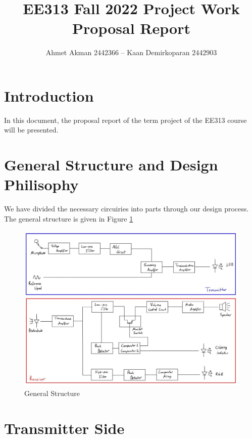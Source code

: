 \documentclass[a4paper,10pt]{IEEEtran}
\title{ \vspace{-2ex} EE313 Fall 2022 Project Work  \protect\\ Proposal Report}
\author{ Ahmet Akman 2442366 -- Kaan Demirkoparan 2442903 \vspace{-2ex}}
\date{}
\begin{document}
\thispagestyle{empty}
\vspace{-2cm}


\maketitle
\vspace{-5cm}

\section{Introduction}
In this document, the proposal report of the term project of the EE313 course will be presented. 
\vspace{-0.4cm}
\section{General Structure and Design Philisophy}
We have divided the necessary circuiries into parts through our design process. The general structure is given in Figure \ref*{general}
\begin{figure}[htbp!]
    \centering
    \includegraphics[width = 1\linewidth]{general_structure.jpeg}
    \caption{General Structure}
    \label{general}
\end{figure} 
\vspace{-0.8cm}
\section{Transmitter Side}
\vspace{-0.1cm}
\end{document}
